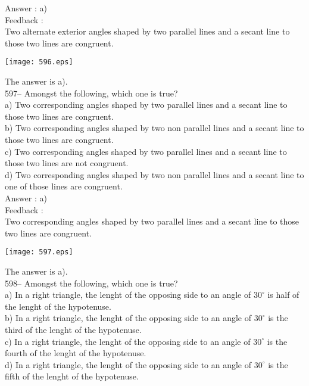 \documentclass[letterpaper, 12pt]{article}
\begin{document}
Answer : a)\\

Feedback : \\
Two alternate exterior angles shaped by two parallel lines and a secant line to those two lines are congruent.
   \begin{center}
    \texttt{[image: 596.eps]}
    \end{center}  The answer is a).\\

597-- Amongst the following, which one is true?\\
a) Two corresponding angles shaped by two parallel lines and a secant line to those two lines are congruent.\\
b) Two corresponding angles shaped by two non parallel lines and a secant line to those two lines are congruent.\\
c) Two corresponding angles shaped by two parallel lines and a secant line to those two lines are not congruent.\\
d) Two corresponding angles shaped by two non parallel lines and a secant line to one of those lines are congruent.\\

Answer : a)\\

Feedback : \\
Two corresponding angles shaped by two parallel lines and a secant line to those two lines are congruent.
   \begin{center}
    \texttt{[image: 597.eps]}
    \end{center}  The answer is a).\\

598-- Amongst the following, which one is true?\\
a) In a right triangle, the lenght of the opposing side to an angle of $30^{\circ}$ is half of the lenght of the hypotenuse.\\
b) In a right triangle, the lenght of the opposing side to an angle of $30^{\circ}$ is the third of the lenght of the hypotenuse. \\
c) In a right triangle, the lenght of the opposing side to an angle of $30^{\circ}$ is the fourth of the lenght of the hypotenuse.  \\
d) In a right triangle, the lenght of the opposing side to an angle of $30^{\circ}$ is the fifth of the lenght of the hypotenuse.  \\
\end{document}
